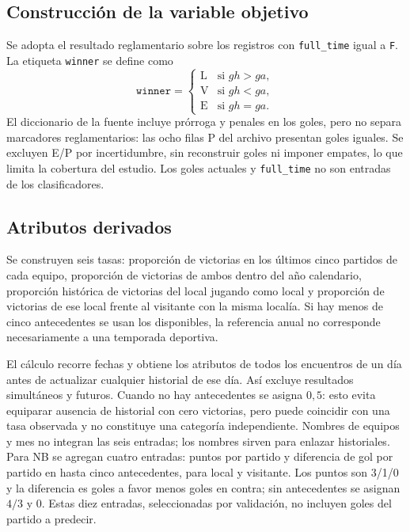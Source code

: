\documentclass[conference]{IEEEtran}
\begin{document}
\subsection{Construcción de la variable objetivo}
Se adopta el resultado reglamentario sobre los registros con \texttt{full\_time} igual a \texttt{F}. La etiqueta \texttt{winner} se define como
\[
\texttt{winner} =
\begin{cases}
\text{L} & \text{si } gh>ga,\\
\text{V} & \text{si } gh<ga,\\
\text{E} & \text{si } gh=ga.
\end{cases}
\]
El diccionario de la fuente incluye prórroga y penales en los goles\cite{b1}, pero no separa marcadores reglamentarios: las ocho filas P del archivo presentan goles iguales. Se excluyen E/P por incertidumbre, sin reconstruir goles ni imponer empates, lo que limita la cobertura del estudio. Los goles actuales y \texttt{full\_time} no son entradas de los clasificadores.

\subsection{Atributos derivados}
Se construyen seis tasas: proporción de victorias en los últimos cinco partidos de cada equipo, proporción de victorias de ambos dentro del año calendario, proporción histórica de victorias del local jugando como local y proporción de victorias de ese local frente al visitante con la misma localía. Si hay menos de cinco antecedentes se usan los disponibles, la referencia anual no corresponde necesariamente a una temporada deportiva.

El cálculo recorre fechas y obtiene los atributos de todos los encuentros de un día antes de actualizar cualquier historial de ese día. Así excluye resultados simultáneos y futuros. Cuando no hay antecedentes se asigna $0{,}5$: esto evita equiparar ausencia de historial con cero victorias, pero puede coincidir con una tasa observada y no constituye una categoría independiente. Nombres de equipos y mes no integran las seis entradas; los nombres sirven para enlazar historiales. Para NB se agregan cuatro entradas: puntos por partido y diferencia de gol por partido en hasta cinco antecedentes, para local y visitante. Los puntos son 3/1/0 y la diferencia es goles a favor menos goles en contra; sin antecedentes se asignan $4/3$ y 0. Estas diez entradas, seleccionadas por validación, no incluyen goles del partido a predecir.
\end{document}
